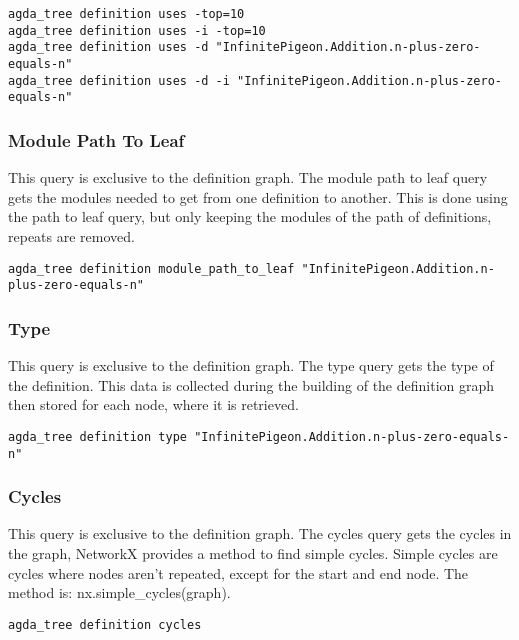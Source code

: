 \begin{lstlisting}
agda_tree definition uses -top=10
agda_tree definition uses -i -top=10
agda_tree definition uses -d "InfinitePigeon.Addition.n-plus-zero-equals-n"
agda_tree definition uses -d -i "InfinitePigeon.Addition.n-plus-zero-equals-n"
\end{lstlisting}

\subsubsection{Module Path To Leaf}

This query is exclusive to the definition graph. The module path to leaf query
gets the modules needed to get from one definition to another. This is done
using the path to leaf query, but only keeping the modules of the path of
definitions, repeats are removed.

\begin{lstlisting}
agda_tree definition module_path_to_leaf "InfinitePigeon.Addition.n-plus-zero-equals-n"
\end{lstlisting}

\subsubsection{Type}

This query is exclusive to the definition graph. The type query gets
the type of the definition. This data is collected during the building of the
definition graph then stored for each node, where it is retrieved.

\begin{lstlisting}
agda_tree definition type "InfinitePigeon.Addition.n-plus-zero-equals-n"
\end{lstlisting}

\subsubsection{Cycles}

This query is exclusive to the definition graph. The cycles query gets the
cycles in the graph, NetworkX provides a method to find simple cycles. Simple
cycles are cycles where nodes aren't repeated, except for the start and end
node. The method is: \textsf{nx.simple\_cycles(graph)}.

\begin{lstlisting}
agda_tree definition cycles
\end{lstlisting}

